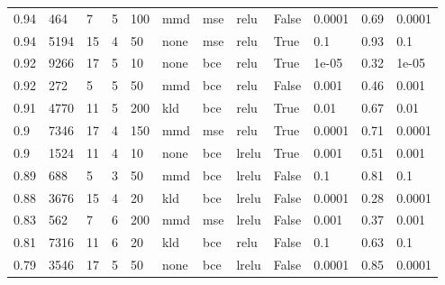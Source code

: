 \begin{longtable}{llllllllllll}
           0.94 &          464 &              7 &        5 &              100 &         mmd &                 mse &                relu &     False &  0.0001 &      0.69 & 0.0001 \\
           0.94 &         5194 &             15 &        4 &               50 &        none &                 mse &                relu &      True &     0.1 &      0.93 &    0.1 \\
           0.92 &         9266 &             17 &        5 &               10 &        none &                 bce &                relu &      True &   1e-05 &      0.32 &  1e-05 \\
           0.92 &          272 &              5 &        5 &               50 &         mmd &                 bce &                relu &     False &   0.001 &      0.46 &  0.001 \\
           0.91 &         4770 &             11 &        5 &              200 &         kld &                 bce &                relu &      True &    0.01 &      0.67 &   0.01 \\
            0.9 &         7346 &             17 &        4 &              150 &         mmd &                 mse &                relu &      True &  0.0001 &      0.71 & 0.0001 \\
            0.9 &         1524 &             11 &        4 &               10 &        none &                 bce &               lrelu &      True &   0.001 &      0.51 &  0.001 \\
           0.89 &          688 &              5 &        3 &               50 &         mmd &                 bce &               lrelu &     False &     0.1 &      0.81 &    0.1 \\
           0.88 &         3676 &             15 &        4 &               20 &         kld &                 bce &               lrelu &     False &  0.0001 &      0.28 & 0.0001 \\
           0.83 &          562 &              7 &        6 &              200 &         mmd &                 mse &               lrelu &     False &   0.001 &      0.37 &  0.001 \\
           0.81 &         7316 &             11 &        6 &               20 &         kld &                 bce &                relu &     False &     0.1 &      0.63 &    0.1 \\
           0.79 &         3546 &             17 &        5 &               50 &        none &                 bce &               lrelu &     False &  0.0001 &      0.85 & 0.0001 \\

\end{longtable}
